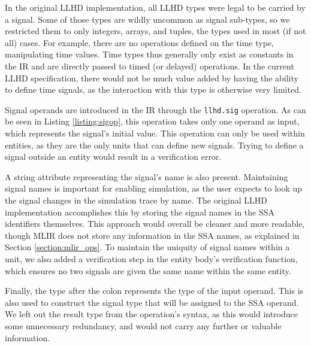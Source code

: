 In the original LLHD implementation, all LLHD types were legal to be carried by a signal. Some of those types are wildly uncommon as signal sub-types, so we restricted them to only integers, arrays, and tuples, the types used in most (if not all) cases. For example, there are no operations defined on the time type, manipulating time values. Time types thus generally only exist as constants in the IR and are directly passed to timed (or delayed) operations. In the current LLHD specification, there would not be much value added by having the ability to define time signals, as the interaction with this type is otherwise very limited.

Signal operands are introduced in the IR through the \texttt{llhd.sig} operation. As can be seen in Listing \ref{listing:sigop}, this operation takes only one operand as input, which represents the signal's initial value. This operation can only be used within entities, as they are the only units that can define new signals. Trying to define a signal outside an entity would result in a verification error.

A string attribute representing the signal's name is also present. Maintaining signal names is important for enabling simulation, as the user expects to look up the signal changes in the simulation trace by name. The original LLHD implementation accomplishes this by storing the signal names in the SSA identifiers themselves. This approach would overall be cleaner and more readable, though MLIR does not store any information in the SSA names, as explained in Section \ref{section:mlir_ops}. To maintain the uniquity of signal names within a unit, we also added a verification step in the entity body's verification function, which ensures no two signals are given the same name within the same entity.

Finally, the type after the colon represents the type of the input operand. This is also used to construct the signal type that will be assigned to the SSA operand. We left out the result type from the operation's syntax, as this would introduce some unnecessary redundancy, and would not carry any further or valuable information.

